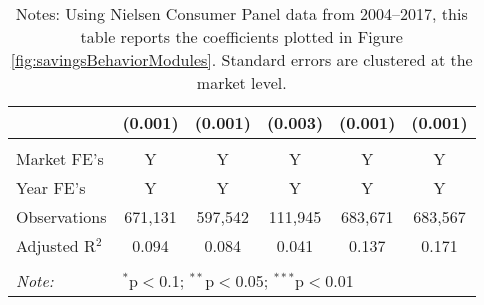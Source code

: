 \begin{table}[!htbp]
{\begin{tabular}{@{\extracolsep{5pt}}lccccc}
  & (0.001) & (0.001) & (0.003) & (0.001) & (0.001) \\
 \hline \\[-1.8ex]
Market FE's & Y & Y & Y & Y & Y \\
Year FE's & Y & Y & Y & Y & Y \\
Observations & 671,131 & 597,542 & 111,945 & 683,671 & 683,567 \\
Adjusted R$^{2}$ & 0.094 & 0.084 & 0.041 & 0.137 & 0.171 \\
\hline
\hline \\[-1.8ex]
\textit{Note:}  & \multicolumn{5}{l}{$^{*}$p$<$0.1; $^{**}$p$<$0.05; $^{***}$p$<$0.01} \\
\end{tabular}
}
\caption*{Notes: Using Nielsen Consumer Panel data from 2004--2017, this table reports the coefficients plotted in Figure \ref{fig:savingsBehaviorModules}. Standard errors are clustered at the market level.}
\end{table}
